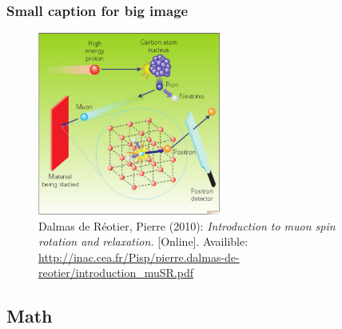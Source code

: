 \begin{frame}[fragile]
	\frametitle{Small caption for big image}
	\begin{figure}[!htb]
		\begin{center}
			\includegraphics[height=6cm, keepaspectratio]{figures/musr_general_principle.png}%
			\caption*{  \setlength{\baselineskip}{6pt}
				{\tiny 
					Dalmas de Réotier, Pierre (2010): \textit{ 						
						Introduction to muon spin rotation and relaxation.
					}
					[Online]. Availible: \url{
						http://inac.cea.fr/Pisp/pierre.dalmas-de-reotier/introduction_muSR.pdf
					}
				}
			}%
		\end{center}
	\end{figure}          
\end{frame}






















\subsection{Math}




